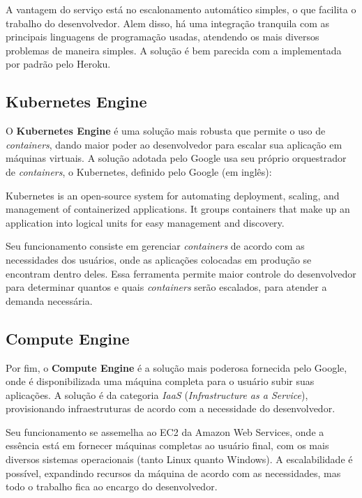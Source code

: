 A vantagem do serviço está no escalonamento automático simples, o que facilita o trabalho do desenvolvedor. Alem disso, há uma integração tranquila com as principais linguagens de programação usadas, atendendo os mais diversos problemas de maneira simples. A solução é bem parecida com a implementada por padrão pelo Heroku.

\subsection{Kubernetes Engine}

O \textbf{Kubernetes Engine} é uma solução mais robusta que permite o uso de \textit{containers}, dando maior poder ao desenvolvedor para escalar sua aplicação em máquinas virtuais. A solução adotada pelo Google usa seu próprio orquestrador de \textit{containers}, o Kubernetes, definido pelo Google (em inglês)\cite{kubernetes}:

\begin{citacaoLonga}
  Kubernetes is an open-source system for automating deployment, scaling, and management of containerized applications. It groups containers that make up an application into logical units for easy management and discovery.
\end{citacaoLonga}

Seu funcionamento consiste em gerenciar \textit{containers} de acordo com as necessidades dos usuários, onde as aplicações colocadas em produção se encontram dentro deles. Essa ferramenta permite maior controle do desenvolvedor para determinar quantos e quais \textit{containers} serão escalados, para atender a demanda necessária.\nocite{googlecloudcontainerengine}

\subsection{Compute Engine}

Por fim, o \textbf{Compute Engine} é a solução mais poderosa fornecida pelo Google, onde é disponibilizada uma máquina completa para o usuário subir suas aplicações. A solução é da categoria \textit{IaaS} (\textit{Infrastructure as a Service}), provisionando infraestruturas de acordo com a necessidade do desenvolvedor.

Seu funcionamento se assemelha ao EC2 da Amazon Web Services, onde a essência está em fornecer máquinas completas ao usuário final, com os mais diversos sistemas operacionais (tanto Linux quanto Windows). A escalabilidade é possível, expandindo recursos da máquina de acordo com as necessidades, mas todo o trabalho fica ao encargo do desenvolvedor.\nocite{googlecloudcomputeengine}

